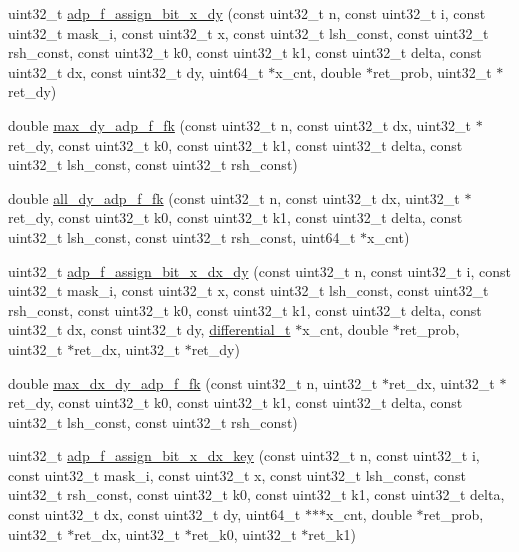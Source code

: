 \begin{DoxyCompactItemize}
\item 
uint32\-\_\-t \hyperlink{adp-tea-f-fk_8hh_aae562be508050d9e6ecdae77897a1133}{adp\-\_\-f\-\_\-assign\-\_\-bit\-\_\-x\-\_\-dy} (const uint32\-\_\-t n, const uint32\-\_\-t i, const uint32\-\_\-t mask\-\_\-i, const uint32\-\_\-t x, const uint32\-\_\-t lsh\-\_\-const, const uint32\-\_\-t rsh\-\_\-const, const uint32\-\_\-t k0, const uint32\-\_\-t k1, const uint32\-\_\-t delta, const uint32\-\_\-t dx, const uint32\-\_\-t dy, uint64\-\_\-t $\ast$x\-\_\-cnt, double $\ast$ret\-\_\-prob, uint32\-\_\-t $\ast$ret\-\_\-dy)
\item 
double \hyperlink{adp-tea-f-fk_8hh_a2f54b400bfcf7269993eb54751c072fb}{max\-\_\-dy\-\_\-adp\-\_\-f\-\_\-fk} (const uint32\-\_\-t n, const uint32\-\_\-t dx, uint32\-\_\-t $\ast$ret\-\_\-dy, const uint32\-\_\-t k0, const uint32\-\_\-t k1, const uint32\-\_\-t delta, const uint32\-\_\-t lsh\-\_\-const, const uint32\-\_\-t rsh\-\_\-const)
\item 
double \hyperlink{adp-tea-f-fk_8hh_addb1c3108db9d2478da5e46e645ba86b}{all\-\_\-dy\-\_\-adp\-\_\-f\-\_\-fk} (const uint32\-\_\-t n, const uint32\-\_\-t dx, uint32\-\_\-t $\ast$ret\-\_\-dy, const uint32\-\_\-t k0, const uint32\-\_\-t k1, const uint32\-\_\-t delta, const uint32\-\_\-t lsh\-\_\-const, const uint32\-\_\-t rsh\-\_\-const, uint64\-\_\-t $\ast$x\-\_\-cnt)
\item 
uint32\-\_\-t \hyperlink{adp-tea-f-fk_8hh_a1fbc1386595fdbbdee8d7b8f19a17d5e}{adp\-\_\-f\-\_\-assign\-\_\-bit\-\_\-x\-\_\-dx\-\_\-dy} (const uint32\-\_\-t n, const uint32\-\_\-t i, const uint32\-\_\-t mask\-\_\-i, const uint32\-\_\-t x, const uint32\-\_\-t lsh\-\_\-const, const uint32\-\_\-t rsh\-\_\-const, const uint32\-\_\-t k0, const uint32\-\_\-t k1, const uint32\-\_\-t delta, const uint32\-\_\-t dx, const uint32\-\_\-t dy, \hyperlink{structdifferential__t}{differential\-\_\-t} $\ast$x\-\_\-cnt, double $\ast$ret\-\_\-prob, uint32\-\_\-t $\ast$ret\-\_\-dx, uint32\-\_\-t $\ast$ret\-\_\-dy)
\item 
double \hyperlink{adp-tea-f-fk_8hh_a2df7ed20567ef6e3c054e2acd67bf267}{max\-\_\-dx\-\_\-dy\-\_\-adp\-\_\-f\-\_\-fk} (const uint32\-\_\-t n, uint32\-\_\-t $\ast$ret\-\_\-dx, uint32\-\_\-t $\ast$ret\-\_\-dy, const uint32\-\_\-t k0, const uint32\-\_\-t k1, const uint32\-\_\-t delta, const uint32\-\_\-t lsh\-\_\-const, const uint32\-\_\-t rsh\-\_\-const)
\item 
uint32\-\_\-t \hyperlink{adp-tea-f-fk_8hh_af150550e5c149d5ded3b70aff98e6bd6}{adp\-\_\-f\-\_\-assign\-\_\-bit\-\_\-x\-\_\-dx\-\_\-key} (const uint32\-\_\-t n, const uint32\-\_\-t i, const uint32\-\_\-t mask\-\_\-i, const uint32\-\_\-t x, const uint32\-\_\-t lsh\-\_\-const, const uint32\-\_\-t rsh\-\_\-const, const uint32\-\_\-t k0, const uint32\-\_\-t k1, const uint32\-\_\-t delta, const uint32\-\_\-t dx, const uint32\-\_\-t dy, uint64\-\_\-t $\ast$$\ast$$\ast$x\-\_\-cnt, double $\ast$ret\-\_\-prob, uint32\-\_\-t $\ast$ret\-\_\-dx, uint32\-\_\-t $\ast$ret\-\_\-k0, uint32\-\_\-t $\ast$ret\-\_\-k1)

\end{DoxyCompactItemize}
